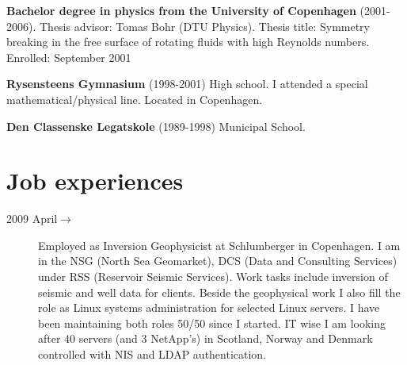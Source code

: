 \documentclass[margin,line,a4paper]{resume05}
\begin{document}
\begin{resume}
    \textbf{Bachelor degree in physics from the University of Copenhagen}
    (2001-2006).  Thesis advisor: Tomas Bohr (DTU Physics).
    Thesis title: Symmetry breaking in the free surface of rotating fluids
    with high Reynolds numbers.  Enrolled: September 2001

    \textbf{Rysensteens Gymnasium} (1998-2001) High school.  I attended a
    special mathematical/physical line. Located in Copenhagen.

    \textbf{Den Classenske Legatskole} (1989-1998) Municipal School.
    

\section{\mysidestyle Job experiences}\vspace{1mm}
\begin{description}
    
    \item[2009 April$\rightarrow$ ] Employed as Inversion Geophysicist at
    Schlumberger in Copenhagen. I am in the NSG (North Sea Geomarket), DCS
    (Data and Consulting Services) under RSS (Reservoir Seismic Services). Work
    tasks include inversion of seismic and well data for clients. Beside the
    geophysical work I also fill the role as Linux systems administration for
    selected Linux servers. I have been maintaining both roles 50/50 since I
    started. IT wise I am looking after 40 servers (and 3 NetApp's) in
    Scotland, Norway and Denmark controlled with NIS and LDAP authentication.


\end{description}
\end{resume}
\end{document}
